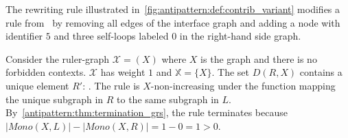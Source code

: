 \begin{example}
  \label{antipattern:example:contrib_variant}
  The rewriting rule illustrated in~\autoref{fig:antipattern:def:contrib_variant} modifies a rule from~\cite[Example 6]{plump2018modular} by removing all edges of the interface graph and adding a node with identifier $5$ and three self-loops labeled $0$ in the right-hand side graph.
  
      Consider the ruler-graph $\mathcal{X} = (X)$ where $X$ is the graph
       and there is no forbidden contexts. $\mathcal{X}$ has weight $1$ and $\mathbb{X} = \{X\}$.
      The set \( D(R,X) \) contains a unique element $R'$:
      . The rule is $X$-non-increasing under the function mapping the unique subgraph in $R$ to the same subgraph in $L$. 
      By~\autoref{antipattern:thm:termination_grs}, the rule terminates because \(|Mono(X,L)| - |Mono(X,R)| = 1 - 0 = 1 > 0 \). 


\end{example}
